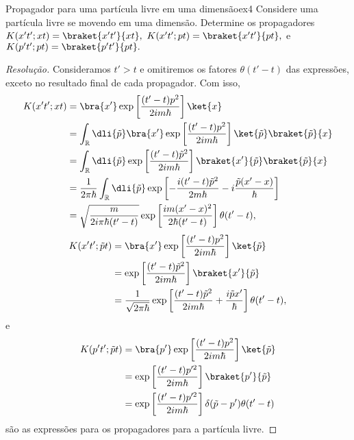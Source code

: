 \begin{exercício}{Propagador para uma partícula livre em uma dimensão}{ex4}
   Considere uma partícula livre se movendo em uma dimensão. Determine os propagadores \(K(x't'; xt) = \braket{x't'}{xt},\) \(K(x't'; pt) = \braket{x't'}{pt},\) e \(K(p't'; pt) = \braket{p't'}{pt}.\)
\end{exercício}
\begin{proof}[Resolução]
    Consideramos \(t' > t\) e omitiremos os fatores \(\theta(t' - t)\) das expressões, exceto no resultado final de cada propagador. Com isso,
    \begin{align*}
       K(x't'; xt) &= \bra{x'}\exp\left[\frac{(t' - t) p^2}{2i m \hbar}\right]\ket{x}\\
                   &= \int_{\mathbb{R}} \dli{\tilde{p}} \bra{x'}\exp\left[\frac{(t' - t) p^2}{2i m \hbar}\right]\ket{\tilde{p}}\braket{\tilde{p}}{x}\\
                   &= \int_{\mathbb{R}} \dli{\tilde{p}} \exp\left[\frac{(t' - t) \tilde{p}^2}{2i m \hbar}\right]\braket{x'}{\tilde{p}}\braket{\tilde{p}}{x}\\
                   &= \frac{1}{2\pi \hbar}\int_{\mathbb{R}} \dli{\tilde{p}}\exp\left[-\frac{i(t' - t) \tilde{p}^2}{2m \hbar} -i\frac{\tilde{p}(x' - x)}{\hbar}\right]\\
                   &= \sqrt{\frac{m}{2i\pi \hbar (t'-t)}}\exp\left[\frac{i m (x' - x)^2}{2\hbar(t' - t)}\right]\theta(t' - t),
    \end{align*}
    \begin{align*}
       K(x' t'; \tilde{p} t) &= \bra{x'} \exp\left[\frac{(t' - t) p^2}{2i m \hbar}\right]\ket{\tilde{p}}\\
                             &= \exp\left[\frac{(t' - t)\tilde{p}^2}{2i m \hbar}\right] \braket{x'}{\tilde{p}}\\
                             &= \frac{1}{\sqrt{2 \pi \hbar}} \exp\left[\frac{(t' - t) \tilde{p}^2}{2i m \hbar} + \frac{i \tilde{p} x'}{\hbar}\right] \theta(t' - t),
    \end{align*}
    e
    \begin{align*}
       K(p' t'; \tilde{p} t) &= \bra{p'}\exp\left[\frac{(t' - t) p^2}{2i m \hbar}\right]\ket{\tilde{p}}\\
                             &= \exp\left[\frac{(t' - t) p'^2}{2i m \hbar}\right] \braket{p'}{\tilde{p}}\\
                             &= \exp\left[\frac{(t' - t) p'^2}{2i m \hbar}\right] \delta(\tilde{p} - p') \theta(t' - t)
    \end{align*}
    são as expressões para os propagadores para a partícula livre.
\end{proof}
